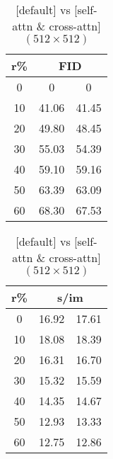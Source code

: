 \begin{table}[htp]
\caption{[default] vs [self-attn \& cross-attn] $(512 \times 512)$}
\label{table:exp_2}
    \begin{minipage}{0.48\textwidth}
        \centering
        \begin{tabular}{|c||c|c|}
            \hline
            \multicolumn{1}{|c||}{r\%} & \multicolumn{2}{c|}{FID}\\
            \hline
            0 & 0 & 0 \\
            10 & 41.06 & 41.45 \\
            20 & 49.80 & 48.45 \\
            30 & 55.03 & 54.39 \\
            40 & 59.10 & 59.16 \\
            50 & 63.39 & 63.09 \\
            60 & 68.30 & 67.53 \\
            \hline
        \end{tabular}
    \end{minipage}
    \hfill
    \begin{minipage}{0.48\textwidth}
        \centering
        \begin{tabular}{|c||c|c|}
            \hline
            \multicolumn{1}{|c||}{r\%} & \multicolumn{2}{c|}{s/im}\\
            \hline
            0 & 16.92 & 17.61 \\
            10 & 18.08 & 18.39 \\
            20 & 16.31 & 16.70 \\
            30 & 15.32 & 15.59 \\
            40 & 14.35 & 14.67 \\
            50 & 12.93 & 13.33 \\
            60 & 12.75 & 12.86 \\
            \hline
        \end{tabular}
    \end{minipage}
\end{table}